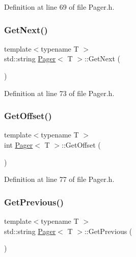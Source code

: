 Definition at line 69 of file Pager.\+h.

\mbox{\label{class_pager_aabe78de5ddc316bdbf28c27b7e6fe19c}} 
\subsubsection{\texorpdfstring{Get\+Next()}{GetNext()}}
{\footnotesize\ttfamily template$<$typename T $>$ \\
std\+::string \mbox{\hyperlink{class_pager}{Pager}}$<$ T $>$\+::Get\+Next (\begin{DoxyParamCaption}{ }\end{DoxyParamCaption})}



Definition at line 73 of file Pager.\+h.

\mbox{\label{class_pager_af5bd96d8da2ed1c03f8091a399ca17f1}} 
\subsubsection{\texorpdfstring{Get\+Offset()}{GetOffset()}}
{\footnotesize\ttfamily template$<$typename T $>$ \\
int \mbox{\hyperlink{class_pager}{Pager}}$<$ T $>$\+::Get\+Offset (\begin{DoxyParamCaption}{ }\end{DoxyParamCaption})}



Definition at line 77 of file Pager.\+h.

\mbox{\label{class_pager_aa1273fc3e89afe229a51f5008f70d536}} 
\subsubsection{\texorpdfstring{Get\+Previous()}{GetPrevious()}}
{\footnotesize\ttfamily template$<$typename T $>$ \\
std\+::string \mbox{\hyperlink{class_pager}{Pager}}$<$ T $>$\+::Get\+Previous (\begin{DoxyParamCaption}{ }\end{DoxyParamCaption})}



